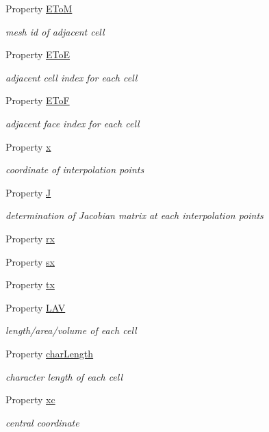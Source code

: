 \begin{DoxyCompactItemize}
\item 
Property \hyperlink{class_ndg_mesh_a8ebf640a8cc273d54d238f58ba42e2dd}{E\+ToM}
\begin{DoxyCompactList}\small\item\em mesh id of adjacent cell \end{DoxyCompactList}\item 
Property \hyperlink{class_ndg_mesh_a49a212cf97726ec1fe5670f33c0f02a1}{E\+ToE}
\begin{DoxyCompactList}\small\item\em adjacent cell index for each cell \end{DoxyCompactList}\item 
Property \hyperlink{class_ndg_mesh_a7d63990483b0dc998fc2273c2382f40b}{E\+ToF}
\begin{DoxyCompactList}\small\item\em adjacent face index for each cell \end{DoxyCompactList}\item 
Property \hyperlink{class_ndg_mesh_a78ce352e49f3a22afb06f1b3a7b41b2e}{x}
\begin{DoxyCompactList}\small\item\em coordinate of interpolation points \end{DoxyCompactList}\item 
Property \hyperlink{class_ndg_mesh_a92bf2cfc980399026e501f15a44b7f19}{J}
\begin{DoxyCompactList}\small\item\em determination of Jacobian matrix at each interpolation points \end{DoxyCompactList}\item 
Property \hyperlink{class_ndg_mesh_a57bac4f1f5fdcfe48791405bd0b687e5}{rx}
\item 
Property \hyperlink{class_ndg_mesh_a838758cb1a0c552f7f84b28290900cc6}{sx}
\item 
Property \hyperlink{class_ndg_mesh_a2186dfa3a6879cfbb88733a7bd4868c3}{tx}
\item 
Property \hyperlink{class_ndg_mesh_aaf1a7c13d209ba6a75518b156204c25f}{L\+AV}
\begin{DoxyCompactList}\small\item\em length/area/volume of each cell \end{DoxyCompactList}\item 
Property \hyperlink{class_ndg_mesh_aca61cfb9f4511fe258125a6548c398f2}{char\+Length}
\begin{DoxyCompactList}\small\item\em character length of each cell \end{DoxyCompactList}\item 
Property \hyperlink{class_ndg_mesh_aef3950d7a9b6cc3d77b23ec5bbdd0ad0}{xc}
\begin{DoxyCompactList}\small\item\em central coordinate \end{DoxyCompactList}\end{DoxyCompactItemize}


